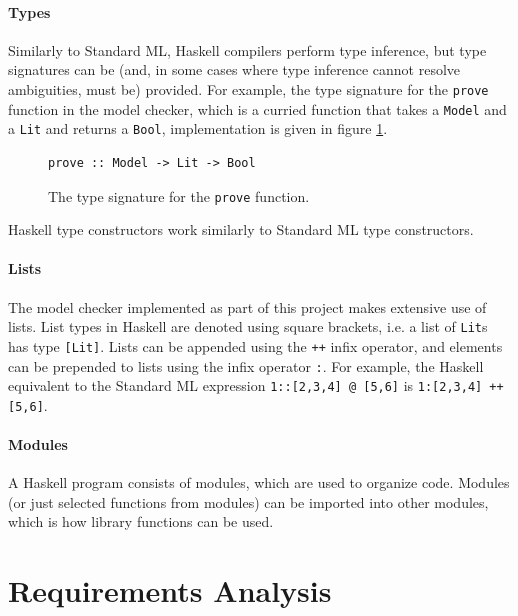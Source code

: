 \documentclass[12pt,a4paper,twoside,openright]{report}
\begin{document}
\paragraph{Types}{
Similarly to Standard ML, Haskell compilers perform type inference, but type
signatures can be (and, in some cases where type inference cannot resolve
ambiguities, must be) provided. For example, the type signature for the
\verb,prove, function in the model checker, which is a curried function
that takes a \verb,Model, and a \verb,Lit, and returns a \verb,Bool,,
implementation is given in figure \ref{typesigexample}.

\begin{figure}[ht!]
\begin{verbatim}
prove :: Model -> Lit -> Bool
\end{verbatim}
\caption{The type signature for the {\tt prove} function.}
\label{typesigexample}
\end{figure}

Haskell type constructors work similarly to Standard ML type constructors.
}

\paragraph{Lists}{
The model checker implemented as part of this project makes extensive use
of lists. List types in Haskell are denoted using square brackets, i.e.
a list of \verb,Lit,s has type \verb,[Lit],.
Lists can be appended using the \verb,++, infix operator, and elements
can be prepended to lists using the infix operator \verb,:,. For
example, the Haskell equivalent to the Standard ML expression \verb.1::[2,3,4] @ [5,6].
is \verb.1:[2,3,4] ++ [5,6]..}

\paragraph{Modules}{
A Haskell program consists of modules, which are used to organize code.
Modules (or just selected functions from modules) can be imported into other
modules, which is how library functions can be used.
}

\section{Requirements Analysis}

\end{document}
